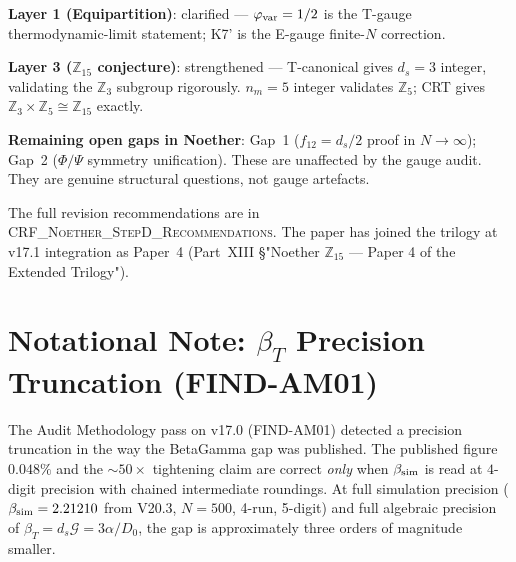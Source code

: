 \documentclass[12pt, a4paper]{article}
\begin{document}
\textbf{Layer 1 (Equipartition)}: clarified --- $\varphi_{\rm var} = 1/2$ is the
T-gauge thermodynamic-limit statement; K7' is the E-gauge finite-$N$ correction.

\textbf{Layer 3 ($\mathbb{Z}_{15}$ conjecture)}: strengthened --- T-canonical
gives $d_s = 3$ integer, validating the $\mathbb{Z}_3$ subgroup rigorously.
$n_m = 5$ integer validates $\mathbb{Z}_5$; CRT gives $\mathbb{Z}_3 \times \mathbb{Z}_5
\cong \mathbb{Z}_{15}$ exactly.

\textbf{Remaining open gaps in Noether}: Gap~1 ($f_{12} = d_s/2$ proof in
$N\to\infty$); Gap~2 ($\Phi/\Psi$ symmetry unification). These are unaffected
by the gauge audit. They are genuine structural questions, not gauge artefacts.

The full revision recommendations are in
\textsc{CRF\_Noether\_StepD\_Recommendations}. The paper has joined the
trilogy at v17.1 integration as Paper~4 (Part~XIII §"Noether
$\mathbb{Z}_{15}$ --- Paper 4 of the Extended Trilogy").

\section{Notational Note: $\beta_T$ Precision Truncation (FIND-AM01)}

The Audit Methodology pass on v17.0 (FIND-AM01) detected a precision
truncation in the way the BetaGamma gap was published. The published
figure $0.048\%$ and the $\sim 50\times$ tightening claim are correct
\emph{only} when $\beta_{\rm sim}$ is read at $4$-digit precision with
chained intermediate roundings. At full simulation precision
($\beta_{\rm sim} = 2.21210$ from V20.3, $N=500$, 4-run, 5-digit) and
full algebraic precision of $\beta_T = d_s\mathcal{G} = 3\alpha/D_0$,
the gap is approximately three orders of magnitude smaller.
\end{document}
